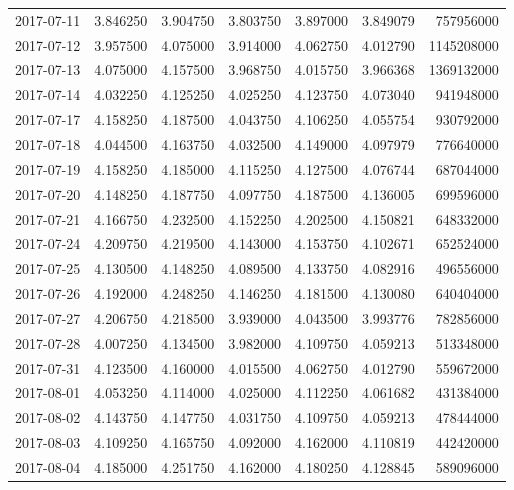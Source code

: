 \begin{tabular}{lrrrrrr}
2017-07-11 &    3.846250 &    3.904750 &    3.803750 &    3.897000 &    3.849079 &   757956000 \\
2017-07-12 &    3.957500 &    4.075000 &    3.914000 &    4.062750 &    4.012790 &  1145208000 \\
2017-07-13 &    4.075000 &    4.157500 &    3.968750 &    4.015750 &    3.966368 &  1369132000 \\
2017-07-14 &    4.032250 &    4.125250 &    4.025250 &    4.123750 &    4.073040 &   941948000 \\
2017-07-17 &    4.158250 &    4.187500 &    4.043750 &    4.106250 &    4.055754 &   930792000 \\
2017-07-18 &    4.044500 &    4.163750 &    4.032500 &    4.149000 &    4.097979 &   776640000 \\
2017-07-19 &    4.158250 &    4.185000 &    4.115250 &    4.127500 &    4.076744 &   687044000 \\
2017-07-20 &    4.148250 &    4.187750 &    4.097750 &    4.187500 &    4.136005 &   699596000 \\
2017-07-21 &    4.166750 &    4.232500 &    4.152250 &    4.202500 &    4.150821 &   648332000 \\
2017-07-24 &    4.209750 &    4.219500 &    4.143000 &    4.153750 &    4.102671 &   652524000 \\
2017-07-25 &    4.130500 &    4.148250 &    4.089500 &    4.133750 &    4.082916 &   496556000 \\
2017-07-26 &    4.192000 &    4.248250 &    4.146250 &    4.181500 &    4.130080 &   640404000 \\
2017-07-27 &    4.206750 &    4.218500 &    3.939000 &    4.043500 &    3.993776 &   782856000 \\
2017-07-28 &    4.007250 &    4.134500 &    3.982000 &    4.109750 &    4.059213 &   513348000 \\
2017-07-31 &    4.123500 &    4.160000 &    4.015500 &    4.062750 &    4.012790 &   559672000 \\
2017-08-01 &    4.053250 &    4.114000 &    4.025000 &    4.112250 &    4.061682 &   431384000 \\
2017-08-02 &    4.143750 &    4.147750 &    4.031750 &    4.109750 &    4.059213 &   478444000 \\
2017-08-03 &    4.109250 &    4.165750 &    4.092000 &    4.162000 &    4.110819 &   442420000 \\
2017-08-04 &    4.185000 &    4.251750 &    4.162000 &    4.180250 &    4.128845 &   589096000 \\

\end{tabular}
